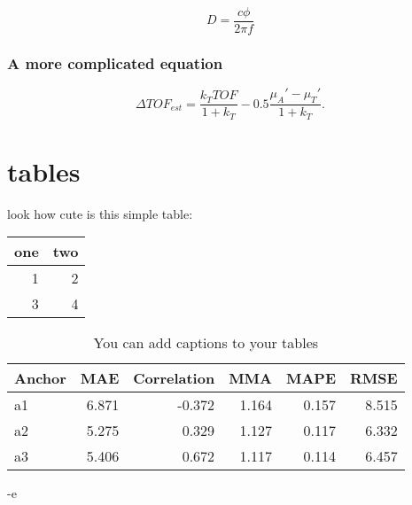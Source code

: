 \begin{equation}
\label{eq:org1f5476e}
D = \frac{c\phi}{2\pi f}
\end{equation}

\subsubsection{A more complicated equation}
\label{sec:orgbc78261}

\begin{equation}
\Delta TOF_{est} = \frac{k_T TOF}{1+k_T } - 0.5 \frac{\mu_A' - \mu_T'}{1+k_T}.
\end{equation}

\section{tables}
\label{sec:org9142079}

look how cute is this simple table:

\begin{center}
\begin{tabular}{rr}
one & two\\
\hline
1 & 2\\
3 & 4\\
\end{tabular}
\end{center}

\begin{table}[htbp]
\caption{\label{tab:org647e189}
You can add captions to your tables}
\centering
\begin{tabular}{lrrrrr}
Anchor & MAE & Correlation & MMA & MAPE & RMSE\\
\hline
a1 & 6.871 & -0.372 & 1.164 & 0.157 & 8.515\\
a2 & 5.275 & 0.329 & 1.127 & 0.117 & 6.332\\
a3 & 5.406 & 0.672 & 1.117 & 0.114 & 6.457\\
\end{tabular}
\end{table}

-e 

